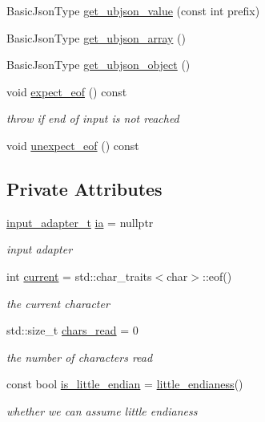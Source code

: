 \begin{DoxyCompactItemize}
Basic\+Json\+Type \hyperlink{classnlohmann_1_1detail_1_1binary__reader_ad8507c0dd14bbddc76c7937c0305a15a}{get\+\_\+ubjson\+\_\+value} (const int prefix)
\item 
Basic\+Json\+Type \hyperlink{classnlohmann_1_1detail_1_1binary__reader_ab808b713f938c625c22c20f2ac7ff3cf}{get\+\_\+ubjson\+\_\+array} ()
\item 
Basic\+Json\+Type \hyperlink{classnlohmann_1_1detail_1_1binary__reader_a8fd127298effd88e0d42f5b70cb5791b}{get\+\_\+ubjson\+\_\+object} ()
\item 
void \hyperlink{classnlohmann_1_1detail_1_1binary__reader_ad0eebfcfd82778a76e1ae72dec49c25f}{expect\+\_\+eof} () const
\begin{DoxyCompactList}\small\item\em throw if end of input is not reached \end{DoxyCompactList}\item 
void \hyperlink{classnlohmann_1_1detail_1_1binary__reader_a1dfc55484af3a896c376b41cd99f3e15}{unexpect\+\_\+eof} () const
\end{DoxyCompactItemize}
\subsection*{Private Attributes}
\begin{DoxyCompactItemize}
\item 
\hyperlink{namespacenlohmann_1_1detail_ae132f8cd5bb24c5e9b40ad0eafedf1c2}{input\+\_\+adapter\+\_\+t} \hyperlink{classnlohmann_1_1detail_1_1binary__reader_adae482b45b2bb733cad3efce034a8b71}{ia} = nullptr
\begin{DoxyCompactList}\small\item\em input adapter \end{DoxyCompactList}\item 
int \hyperlink{classnlohmann_1_1detail_1_1binary__reader_a7e994e201b215cd6d6ae28a1853f43e0}{current} = std\+::char\+\_\+traits$<$char$>$\+::eof()
\begin{DoxyCompactList}\small\item\em the current character \end{DoxyCompactList}\item 
std\+::size\+\_\+t \hyperlink{classnlohmann_1_1detail_1_1binary__reader_a2dbde0b7390100efe0bfc54e21c3a34b}{chars\+\_\+read} = 0
\begin{DoxyCompactList}\small\item\em the number of characters read \end{DoxyCompactList}\item 
const bool \hyperlink{classnlohmann_1_1detail_1_1binary__reader_a54c18bdb48cccf35a8f941640e0fcea4}{is\+\_\+little\+\_\+endian} = \hyperlink{classnlohmann_1_1detail_1_1binary__reader_a1d8f70f95d241354f86a0b9ae711c1c3}{little\+\_\+endianess}()
\begin{DoxyCompactList}\small\item\em whether we can assume little endianess \end{DoxyCompactList}\end{DoxyCompactItemize}


